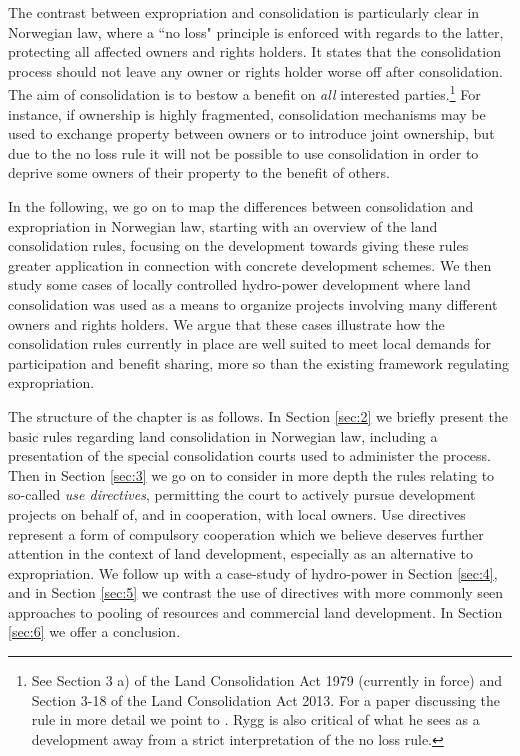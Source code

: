 The contrast between expropriation and consolidation is particularly clear in Norwegian law, where a ``no loss" principle is enforced with regards to the latter, protecting all affected owners and rights holders. It states that the consolidation process should not leave any owner or rights holder worse off after consolidation. The aim of consolidation is to bestow a benefit on \emph{all} interested parties.\footnote{See Section 3 a) of the Land Consolidation Act 1979 (currently in force) and Section 3-18 of the Land Consolidation Act 2013. For a paper discussing the rule in more detail we point to \cite{rygg1998}. Rygg is also critical of what he sees as a development away from a strict interpretation of the no loss rule.} For instance, if ownership is highly fragmented, consolidation mechanisms may be used to exchange property between owners or to introduce joint ownership, but due to the no loss rule it will not be possible to use consolidation in order to deprive some owners of their property to the benefit of others.

In the following, we go on to map the differences between consolidation and expropriation in Norwegian law, starting with an overview of the land consolidation rules, focusing on the development towards giving these rules greater application in connection with concrete development schemes. We then study some cases of locally controlled hydro-power development where land consolidation was used as a means to organize projects involving many different owners and rights holders. We argue that these cases illustrate how the consolidation rules currently in place are well suited to meet local demands for participation and benefit sharing, more so than the existing framework regulating expropriation.

The structure of the chapter is as follows. In Section \ref{sec:2} we briefly present the basic rules regarding land consolidation in Norwegian law, including a presentation of the special consolidation courts used to administer the process. Then in Section \ref{sec:3} we go on to consider in more depth the rules relating to so-called \emph{use directives}, permitting the court to actively pursue development projects on behalf of, and in cooperation, with local owners. Use directives represent a form of compulsory cooperation which we believe deserves further attention in the context of land development, especially as an alternative to expropriation. We follow up with a case-study of hydro-power in Section \ref{sec:4}, and in Section \ref{sec:5} we contrast the use of directives with more commonly seen approaches to pooling of resources and commercial land development. In Section \ref{sec:6} we offer a conclusion.

